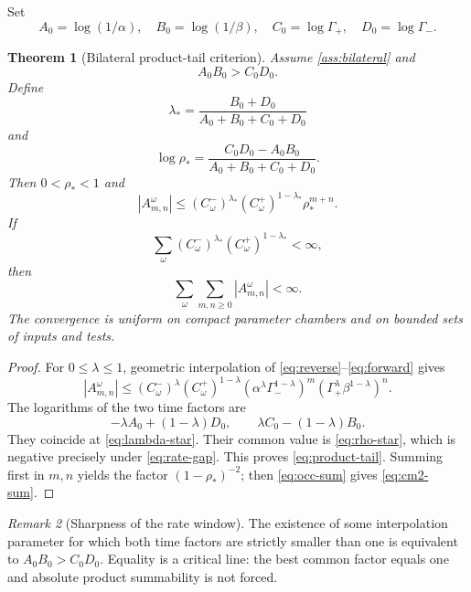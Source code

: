 \documentclass[11pt,reqno]{amsart}
\newtheorem{theorem}{Theorem}[section]
\theoremstyle{definition}
\theoremstyle{remark}
\newtheorem{remark}[theorem]{Remark}
\newcommand{\abs}[1]{\left\lvert #1\right\rvert}
\begin{document}
Set
\[
 A_0=\log(1/\alpha),\quad B_0=\log(1/\beta),\quad
 C_0=\log\Gamma_+,\quad D_0=\log\Gamma_-.
\]

\begin{theorem}[Bilateral product-tail criterion]\label{thm:bilateral}
Assume \cref{ass:bilateral} and
\begin{equation}\label{eq:rate-gap}
 A_0B_0>C_0D_0.
\end{equation}
Define
\begin{equation}\label{eq:lambda-star}
 \lambda_*=
 \frac{B_0+D_0}{A_0+B_0+C_0+D_0}
\end{equation}
and
\begin{equation}\label{eq:rho-star}
 \log\rho_*=\frac{C_0D_0-A_0B_0}
 {A_0+B_0+C_0+D_0}.
\end{equation}
Then $0<\rho_*<1$ and
\begin{equation}\label{eq:product-tail}
 \abs{A_{m,n}^{\omega}}
 \le (C_\omega^-)^{\lambda_*}(C_\omega^+)^{1-\lambda_*}
 \rho_*^{m+n}.
\end{equation}
If
\begin{equation}\label{eq:occ-sum}
 \sum_{\omega}
 (C_\omega^-)^{\lambda_*}(C_\omega^+)^{1-\lambda_*}<\infty,
\end{equation}
then
\begin{equation}\label{eq:cm2-sum}
 \sum_{\omega}\sum_{m,n\ge0}\abs{A_{m,n}^{\omega}}<\infty.
\end{equation}
The convergence is uniform on compact parameter chambers and on bounded sets
of inputs and tests.
\end{theorem}

\begin{proof}
For $0\le\lambda\le1$, geometric interpolation of
\eqref{eq:reverse}--\eqref{eq:forward} gives
\[
 \abs{A_{m,n}^{\omega}}
 \le (C_\omega^-)^\lambda(C_\omega^+)^{1-\lambda}
 (\alpha^\lambda\Gamma_-^{1-\lambda})^m
 (\Gamma_+^\lambda\beta^{1-\lambda})^n.
\]
The logarithms of the two time factors are
\[
 -\lambda A_0+(1-\lambda)D_0,
 \qquad
 \lambda C_0-(1-\lambda)B_0.
\]
They coincide at \eqref{eq:lambda-star}.  Their common value is
\eqref{eq:rho-star}, which is negative precisely under
\eqref{eq:rate-gap}.  This proves \eqref{eq:product-tail}.  Summing first in
$m,n$ yields the factor $(1-\rho_*)^{-2}$; then
\eqref{eq:occ-sum} gives \eqref{eq:cm2-sum}.
\end{proof}

\begin{remark}[Sharpness of the rate window]
The existence of some interpolation parameter for which both time factors are
strictly smaller than one is equivalent to $A_0B_0>C_0D_0$.  Equality is a
critical line: the best common factor equals one and absolute product
summability is not forced.
\end{remark}
\end{document}
